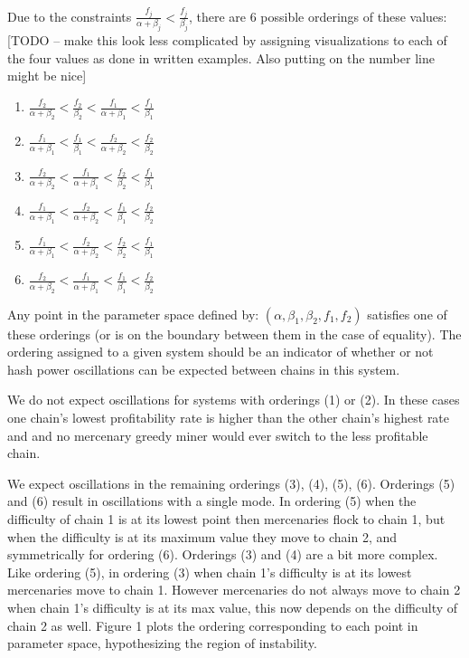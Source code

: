 \documentclass[10pt, preprint]{aastex}
\begin{document}
Due to the constraints $\frac{f_j}{\alpha + \beta_j} < \frac{f_j}{\beta_j}$, there are 6 possible orderings of these values: [TODO -- make this look less complicated by assigning visualizations to each of the four values as done in written examples.  Also putting on the number line might be nice]
\begin{enumerate}
\item
$\frac{f_2}{\alpha + \beta_2} < \frac{f_2}{\beta_2} < \frac{f_1}{\alpha + \beta_1} < \frac{f_1}{\beta_1}$
\item
$\frac{f_1}{\alpha + \beta_1} < \frac{f_1}{\beta_1} < \frac{f_2}{\alpha + \beta_2} < \frac{f_2}{\beta_2} $
\item
$\frac{f_2}{\alpha + \beta_2} < \frac{f_1}{\alpha + \beta_1} < \frac{f_2}{\beta_2} < \frac{f_1}{\beta_1}$
\item
$\frac{f_1}{\alpha + \beta_1} < \frac{f_2}{\alpha + \beta_2} < \frac{f_1}{\beta_1} < \frac{f_2}{\beta_2}$
\item
$\frac{f_1}{\alpha + \beta_1} <  \frac{f_2}{\alpha + \beta_2} < \frac{f_2}{\beta_2} <  \frac{f_1}{\beta_1} $
\item
$ \frac{f_2}{\alpha + \beta_2} <  \frac{f_1}{\alpha + \beta_1} < \frac{f_1}{\beta_1}  < \frac{f_2}{\beta_2} $
\end{enumerate}

Any point in the parameter space defined by: $(\alpha, \beta_1, \beta_2, f_1, f_2)$ satisfies one of these orderings (or is on the boundary between them in the case of equality).  The ordering assigned to a given system should be an indicator of whether or not hash power oscillations can be expected between chains in this system.  

We do not expect oscillations for systems with orderings (1) or (2).  In these cases one chain's lowest profitability rate is higher than the other chain's highest rate and and no mercenary greedy miner would ever switch to the less profitable chain.  

We expect oscillations in the remaining orderings (3), (4), (5), (6).  Orderings (5) and (6) result in oscillations with a single mode.  In ordering (5) when the difficulty of chain 1 is at its lowest point then mercenaries flock to chain 1, but when the difficulty is at its maximum value they move to chain 2, and symmetrically for ordering (6).  Orderings (3) and (4) are a bit more complex.  Like ordering (5), in ordering (3) when chain 1's difficulty is at its lowest mercenaries move to chain 1.  However mercenaries do not always move to chain 2 when chain 1's difficulty is at its max value, this now depends on the difficulty of chain 2 as well.  Figure 1 plots the ordering corresponding to each point in parameter space, hypothesizing the region of instability.
\end{document}
